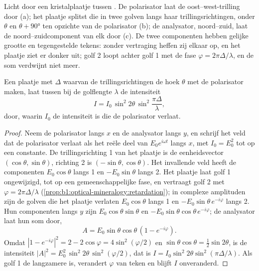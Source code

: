 \begin{omfigure}
{\small Licht door een kristalplaatje tussen . De polarisator laat de oost--west-trilling door (a); het plaatje splitst die in twee golven
langs haar trillingsrichtingen, onder $\theta$ en $\theta + \ang{90}$ ten opzichte van de polarisator (b); de analysator, noord--zuid, laat de noord--zuidcomponent van
elk door (c). De twee componenten hebben gelijke grootte en tegengestelde tekens: zonder vertraging heffen zij elkaar op, en het plaatje ziet er donker uit; golf 2 loopt
achter golf 1 met de fase $\varphi = 2\pi\Delta/\lambda$, en de som verdwijnt niet meer.}
\end{omfigure}

\begin{theorem}\label{thm:b1:optical-mineralogy:intensity}
Een plaatje met  $\Delta$ waarvan de trillingsrichtingen de hoek $\theta$ met de polarisator maken, laat tussen  bij de
golflengte $\lambda$ de intensiteit
\[
  I = I_0\,\sin^2 2\theta\,\sin^2\frac{\pi\Delta}{\lambda},
\]
door, waarin $I_0$ de intensiteit is die de polarisator verlaat.
\end{theorem}

\begin{proof}
Neem de polarisator langs $x$ en de analysator langs $y$, en schrijf het veld dat de polarisator verlaat als het reële deel van $E_0 e^{i\omega t}$ langs $x$, met
$I_0 = E_0^2$ tot op een constante. De trillingsrichting 1 van het plaatje is de eenheidsvector $(\cos\theta, \sin\theta)$, richting 2 is $(-\sin\theta, \cos\theta)$.
Het invallende veld heeft de componenten $E_0\cos\theta$ langs 1 en $-E_0\sin\theta$ langs 2. Het plaatje laat golf 1 ongewijzigd, tot op een gemeenschappelijke
fase, en vertraagt golf 2 met $\varphi = 2\pi\Delta/\lambda$ (\cref{prop:b1:optical-mineralogy:retardation}); in complexe amplituden zijn de golven die het plaatje
verlaten $E_0\cos\theta$ langs 1 en $-E_0\sin\theta\,e^{-i\varphi}$ langs 2. Hun componenten langs $y$ zijn $E_0\cos\theta\sin\theta$ en
$-E_0\sin\theta\cos\theta\,e^{-i\varphi}$; de analysator laat hun som door,
\[
  A = E_0\sin\theta\cos\theta\,(1 - e^{-i\varphi}) .
\]
Omdat $|1 - e^{-i\varphi}|^2 = 2 - 2\cos\varphi = 4\sin^2(\varphi/2)$ en
$\sin\theta\cos\theta = \frac12\sin2\theta$, is de intensiteit
$|A|^2 = E_0^2\,\sin^2 2\theta\,\sin^2(\varphi/2)$, dat is
$I = I_0\sin^2 2\theta\sin^2(\pi\Delta/\lambda)$. Als golf 1 de langzamere is, verandert
$\varphi$ van teken en blijft $I$ onveranderd.
\end{proof}

